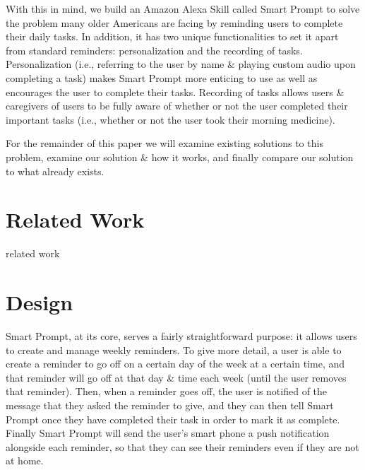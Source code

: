 \documentclass[11pt, oneside]{article}
\begin{document}
With this in mind, we build an Amazon Alexa Skill called Smart Prompt to solve the problem many older Americans are facing by reminding users to complete their daily tasks. 
In addition, it has two unique functionalities to set it apart from standard reminders: personalization and the recording of tasks. 
Personalization (i.e., referring to the user by name \& playing custom audio upon completing a task) makes Smart Prompt more enticing to use as well as encourages the user to complete their tasks. 
Recording of tasks allows users \& caregivers of users to be fully aware of whether or not the user completed their important tasks (i.e., whether or not the user took their morning medicine). 

For the remainder of this paper we will examine existing solutions to this problem, examine our solution \& how it works, and finally compare our solution to what already exists. 


\section{Related Work}

related work


\section{Design}

Smart Prompt, at its core, serves a fairly straightforward purpose: it allows users to create and manage weekly reminders. 
To give more detail, a user is able to create a reminder to go off on a certain day of the week at a certain time, and that reminder will go off at that day \& time each week (until the user removes that reminder). 
Then, when a reminder goes off, the user is notified of the message that they asked the reminder to give, and they can then tell Smart Prompt once they have completed their task in order to mark it as complete. 
Finally Smart Prompt will send the user's smart phone a push notification alongside each reminder, so that they can see their reminders even if they are not at home. 
\end{document}

